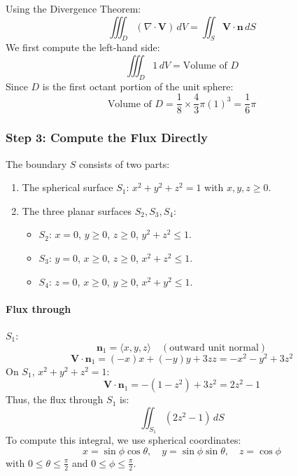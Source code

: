 \documentclass[11pt]{article}
\begin{document}
Using the Divergence Theorem:
\[
\iiint_{D} (\nabla \cdot \mathbf{V}) \, dV = \iint_{S} \mathbf{V} \cdot \mathbf{n} \, dS
\]
We first compute the left-hand side:
\[
\iiint_{D} 1 \, dV = \text{Volume of } D
\]
Since \( D \) is the first octant portion of the unit sphere:
\[
\text{Volume of } D = \frac{1}{8} \times \frac{4}{3}\pi (1)^3 = \frac{1}{6}\pi
\]

\subsubsection*{Step 3: Compute the Flux Directly}

The boundary \( S \) consists of two parts:
\begin{enumerate}
    \item The spherical surface \( S_1 \): \( x^2 + y^2 + z^2 = 1 \) with \( x, y, z \geq 0 \).
    \item The three planar surfaces \( S_2, S_3, S_4 \):
    \begin{itemize}
        \item \( S_2 \): \( x = 0 \), \( y \geq 0 \), \( z \geq 0 \), \( y^2 + z^2 \leq 1 \).
        \item \( S_3 \): \( y = 0 \), \( x \geq 0 \), \( z \geq 0 \), \( x^2 + z^2 \leq 1 \).
        \item \( S_4 \): \( z = 0 \), \( x \geq 0 \), \( y \geq 0 \), \( x^2 + y^2 \leq 1 \).
    \end{itemize}
\end{enumerate}

\paragraph{Flux through } $S_1$:
\[
\mathbf{n}_1 = \langle x, y, z \rangle \quad (\text{outward unit normal})
\]
\[
\mathbf{V} \cdot \mathbf{n}_1 = (-x)x + (-y)y + 3z z = -x^2 - y^2 + 3z^2
\]
On \( S_1 \), \( x^2 + y^2 + z^2 = 1 \):
\[
\mathbf{V} \cdot \mathbf{n}_1 = - (1 - z^2) + 3z^2 = 2z^2 - 1
\]
Thus, the flux through \( S_1 \) is:
\[
\iint_{S_1} (2z^2 - 1) \, dS
\]
To compute this integral, we use spherical coordinates:
\[
x = \sin\phi \cos\theta, \quad y = \sin\phi \sin\theta, \quad z = \cos\phi
\]
with \( 0 \leq \theta \leq \frac{\pi}{2} \) and \( 0 \leq \phi \leq \frac{\pi}{2} \).
\end{document}
